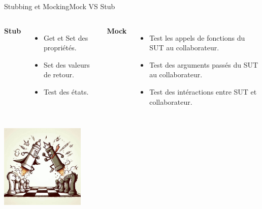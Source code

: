 \documentclass{beamer}
\begin{document}
    \begin{frame}{Stubbing et Mocking}{Mock VS Stub}
        \begin{columns}
            \centering
            \begin{large}
                \textbf{Stub}
            \end{large}
            \flushleft
            \begin{itemize}
                \item Get et Set des propriétés.
                \item Set des valeurs de retour.
                \item Test des états.
            \end{itemize}
            \centering
            \begin{large}
                \textbf{Mock}
            \end{large}
            \flushleft
            \begin{itemize}
                \item Test les appels de fonctions du SUT au collaborateur.
                \item Test des arguments passés du SUT au collaborateur.
                \item Test des intéractions entre SUT et collaborateur.
            \end{itemize}
        \end{columns}
        \begin{center}
            \includegraphics[width=4cm]{image/mock-stub-fight}
        \end{center}
    \end{frame}
\end{document}
